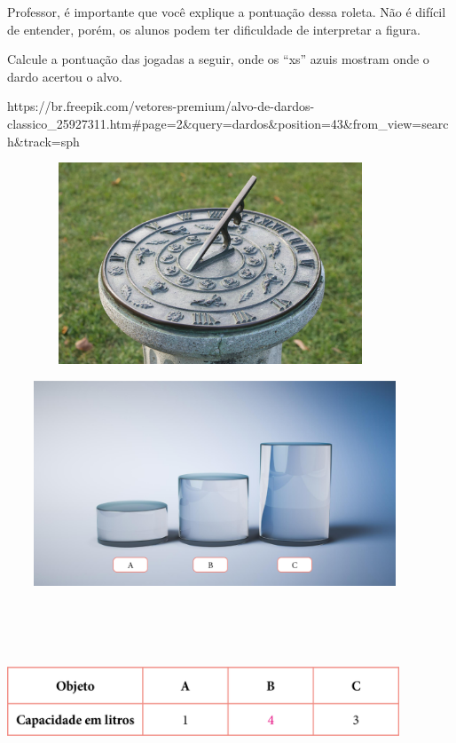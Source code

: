 Professor, é importante que você explique a pontuação dessa roleta. Não
é difícil de entender, porém, os alunos podem ter dificuldade de
interpretar a figura.

Calcule a pontuação das jogadas a seguir, onde os ``xs'' azuis mostram
onde o dardo acertou o alvo.

https://br.freepik.com/vetores-premium/alvo-de-dardos-classico\_25927311.htm\#page=2\&query=dardos\&position=43\&from\_view=search\&track=sph

\includegraphics[width=4.77085in,height=2.36458in]{media/image33.png}

\includegraphics[width=4.87500in,height=2.40625in]{media/image34.png}

\includegraphics[width=4.60417in,height=2.33333in]{media/image35.png}

